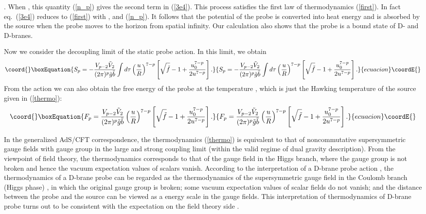 \documentclass[a4paper,12pt]{article}
\begin{document}
\coordHE{}. When
\coordHE{}, this quantity (\ref{n_p}) gives the second term in
(\ref{3e4}). This process satisfies the first law of thermodynamics
(\ref{first}). In fact eq.~(\ref{3e4}) reduces to (\ref{first}) with \coordHE{},
\coordHE{} and (\ref{n_p}). It follows that the potential of the
probe is converted into heat energy and is absorbed by the source when the
probe moves to the horizon from  spatial infinity. Our calculation also
shows that the probe is a bound state of D\coordHE{}- and D\coordHE{}-branes.

Now we consider the decoupling limit of the static probe action. In this
limit, we obtain
\begin{equation}\coord{}\boxEquation{
\label{3e7}
S_p=-\frac{V_{p-2}\tilde{V}_2}{(2\pi)^p\tilde{g}\tilde{b}}\int d\tau
  \left(\frac{u}{R}\right)^{7-p}\left[\sqrt{\tilde{f}}-1+
    \frac{u_0^{7-p}}{2u^{7-p}}\right].
}{
S_p=-\frac{V_{p-2}\tilde{V}_2}{(2\pi)^p\tilde{g}\tilde{b}}\int d\tau
  \left(\frac{u}{R}\right)^{7-p}\left[\sqrt{\tilde{f}}-1+
    \frac{u_0^{7-p}}{2u^{7-p}}\right].
}{ecuacion}\coordE{}\end{equation}
{}From the action we can also obtain the free energy of the probe at the
temperature \coordHE{}, which is just the Hawking temperature of the source given
in (\ref{thermo}):
\begin{equation}\coord{}\boxEquation{
\label{3e8}
F_p=\frac{V_{p-2}\tilde{V}_2}{(2\pi)^p\tilde{g}\tilde{b}}
  \left(\frac{u}{R}\right)^{7-p}\left[\sqrt{\tilde{f}}-1+
    \frac{u_0^{7-p}}{2u^{7-p}}\right].
}{
F_p=\frac{V_{p-2}\tilde{V}_2}{(2\pi)^p\tilde{g}\tilde{b}}
  \left(\frac{u}{R}\right)^{7-p}\left[\sqrt{\tilde{f}}-1+
    \frac{u_0^{7-p}}{2u^{7-p}}\right].
}{ecuacion}\coordE{}\end{equation}

In the generalized AdS/CFT correspondence, the thermodynamics (\ref{thermo})
is equivalent to that of noncommutative supersymmetric gauge fields
with gauge group \coordHE{} in the large \coordHE{} and strong coupling limit (within
the valid regime of dual gravity description). From the viewpoint of field
theory, the thermodynamics corresponds to that of the gauge field in the
Higgs branch, where the gauge group is not broken and hence the vacuum
expectation values of scalars vanish. According to the interpretation of
a D-brane probe action \cite{Mald3}, the thermodynamics of a D-brane probe
can be regarded as the thermodynamics of the supersymmetric gauge field
in the Coulomb branch (Higgs phase) \cite{AA,Kirit}, in which the original
gauge group is broken; some vacuum expectation values of scalar fields
do not vanish; and the distance \coordHE{} between the probe and the source can
be viewed as a energy scale in the gauge fields. This interpretation of
thermodynamics of D-brane probe turns out to be consistent with
the expectation on the field theory side \cite{AA,Kirit}.
\end{document}
